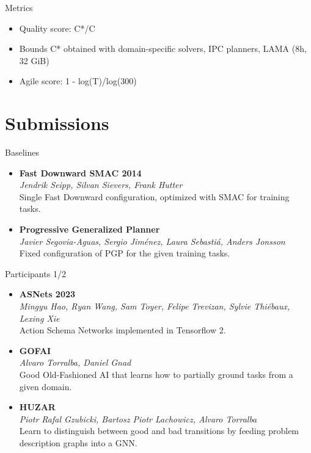 \documentclass[aspectratio=169,xcolor=dvipsnames]{beamer}
\begin{document}
\begin{frame}{Metrics}
    \begin{itemize}
        \item Quality score: C*/C
        \item Bounds C* obtained with domain-specific solvers, IPC planners, LAMA (8h, 32 GiB)
        \item Agile score: 1 - log(T)/log(300)
    \end{itemize}
\end{frame}

\section{Submissions}

\begin{frame}{Baselines}
\begin{itemize}
\item
    \textbf{Fast Downward SMAC 2014}\\
    \emph{Jendrik Seipp, Silvan Sievers, Frank Hutter}\\
    Single Fast Downward
    configuration, optimized with SMAC for training tasks.
\item
    \textbf{Progressive Generalized Planner}\\
    \emph{Javier
    Segovia-Aguas, Sergio Jiménez, Laura Sebastiá, Anders Jonsson}\\
    Fixed configuration of PGP for the given training tasks.
\end{itemize}
\end{frame}

\begin{frame}{Participants 1/2}
\begin{itemize}
\item
    \textbf{ASNets 2023}\\
    \emph{Mingyu Hao, Ryan Wang, Sam Toyer, Felipe Trevizan, Sylvie
    Thiébaux, Lexing Xie}\\
    Action Schema Networks implemented in Tensorflow 2.
\item
    \textbf{GOFAI}\\
    \emph{Alvaro Torralba, Daniel Gnad}\\
    Good Old-Fashioned AI that learns
    how to partially ground tasks from a given domain.
\item
    \textbf{HUZAR}\\
    \emph{Piotr Rafal Gzubicki, Bartosz Piotr Lachowicz, Alvaro Torralba}\\
    Learn to distinguish between good and bad transitions by feeding
    problem description graphs into a GNN.
\end{itemize}
\end{frame}
\end{document}
